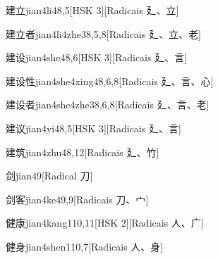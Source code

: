 \begin{entry}{建立}{jian4li4}{8,5}[HSK 3][Radicais ⼵、⽴]
\end{entry}

\begin{entry}{建立者}{jian4li4zhe3}{8,5,8}[Radicais ⼵、⽴、⽼]
\end{entry}

\begin{entry}{建设}{jian4she4}{8,6}[HSK 3][Radicais ⼵、⾔]
\end{entry}

\begin{entry}{建设性}{jian4she4xing4}{8,6,8}[Radicais ⼵、⾔、⼼]
\end{entry}

\begin{entry}{建设者}{jian4she4zhe3}{8,6,8}[Radicais ⼵、⾔、⽼]
\end{entry}

\begin{entry}{建议}{jian4yi4}{8,5}[HSK 3][Radicais ⼵、⾔]
\end{entry}

\begin{entry}{建筑}{jian4zhu4}{8,12}[Radicais ⼵、⽵]
\end{entry}

\begin{entry}{剑}{jian4}{9}[Radical ⼑]
\end{entry}

\begin{entry}{剑客}{jian4ke4}{9,9}[Radicais ⼑、⼧]
\end{entry}

\begin{entry}{健康}{jian4kang1}{10,11}[HSK 2][Radicais ⼈、⼴]
\end{entry}

\begin{entry}{健身}{jian4shen1}{10,7}[Radicais ⼈、⾝]
\end{entry}


